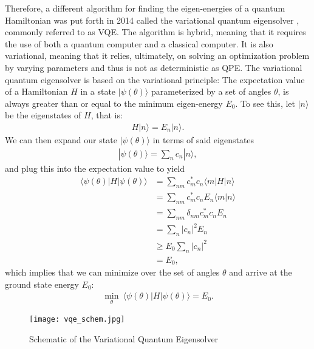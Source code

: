 \documentclass[Dual]{msu-thesis}
\begin{document}
Therefore, a different algorithm for finding the eigen-energies of a quantum Hamiltonian was put forth in 2014 called the variational quantum eigensolver \cite{ref:vqe}, commonly referred to as VQE. The algorithm is hybrid, meaning that it requires the use of both a quantum computer and a classical computer. It is also variational, meaning that it relies, ultimately, on solving an optimization problem by varying parameters and thus is not as deterministic as QPE. The variational quantum eigensolver is based on the variational principle: The expectation value of a Hamiltonian $H$ in a state $|\psi(\theta)\rangle$ parameterized by a set of angles $\theta$, is always greater than or equal to the minimum eigen-energy $E_0$. To see this, let $|n\rangle$ be the eigenstates of $H$, that is:
\begin{align}
H|n\rangle=E_n|n\rangle
.\end{align}
We can then expand our state $|\psi(\theta)\rangle$ in terms of said eigenstates
\begin{align}
|\psi(\theta)\rangle=\sum_nc_n|n\rangle
,\end{align}
and plug this into the expectation value to yield
\begin{align}
\langle\psi(\theta)|H|\psi(\theta)\rangle
&=
\sum_{nm}c^*_mc_n\langle m|H|n \rangle
\nonumber
\\
&=
\sum_{nm}c^*_mc_nE_n\langle m|n \rangle
\nonumber
\\
&=
\sum_{nm}\delta_{nm}c^*_mc_nE_n
\nonumber
\\
&=
\sum_{n}|c_n|^2E_n
\nonumber
\\
&\geq
E_0\sum_{n}|c_n|^2
\nonumber
\\
&=
E_0
,\end{align}
which implies that we can minimize over the set of angles $\theta$ and arrive at the ground state energy $E_0$:
\begin{align}
\min_\theta \ \langle\psi(\theta)|H|\psi(\theta)\rangle
=
E_0
.\end{align}

\begin{figure}[h]
    \centering
    \texttt{[image: vqe\_schem.jpg]}
    \caption{Schematic of the Variational Quantum Eigensolver}
    \label{fig:vqe_schem}
\end{figure}
\end{document}
